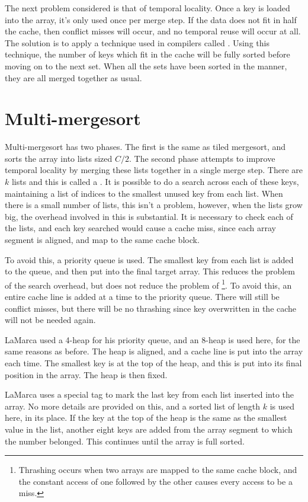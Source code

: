 The next problem considered is that of temporal locality. Once a key is loaded
into the array, it's only used once per merge step. If the data does not fit in
half the cache, then conflict misses will occur, and no temporal reuse will
occur at all. The solution is to apply a technique used in compilers called
. Using this technique, the number of keys which fit in the cache will
be fully sorted before moving on to the next set. When all the sets have been
sorted in the manner, they are all merged together as usual.

\section{Multi-mergesort}

Multi-mergesort has two phases. The first is the same as tiled mergesort, and
sorts the array into lists sized $C/2$. The second phase attempts to improve
temporal locality by merging these lists together in a single merge step. There
are $k$ lists and this is called a . It is possible to do a
search across each of these keys, maintaining a list of indices to the smallest
unused key from each list. When there is a small number of lists, this isn't a
problem, however, when the lists grow big, the overhead involved in this is
substantial. It is necessary to check each of the lists, and each key searched
would cause a cache miss, since each array segment is aligned, and map to
the same cache block.

To avoid this, a priority queue is used. The smallest key from each list is
added to the queue, and then put into the final target array. This reduces the
problem of the search overhead, but does not reduce the problem of
\footnote{Thrashing occurs when two arrays are mapped to the same
cache block, and the constant access of one followed by the other causes every
access to be a miss.}.  To avoid this, an entire cache line is added at a time
to the priority queue. There will still be conflict misses, but there will be no
thrashing since key overwritten in the cache will not be needed again.

LaMarca used a 4-heap for his priority queue, and an 8-heap is used here, for
the same reasons as before. The heap is aligned, and a cache line
is put into the array each time. The smallest key is at the top of the heap,
and this is put into its final position in the array. The heap is then fixed.

LaMarca uses a special tag to mark the last key from each list inserted into
the array. No more details are provided on this, and a sorted list of length $k$
is used here, in its place.  If the key at the top of the heap is the same as
the smallest value in the list, another eight keys are added from the array
segment to which the number belonged. This continues until the array is full
sorted.

